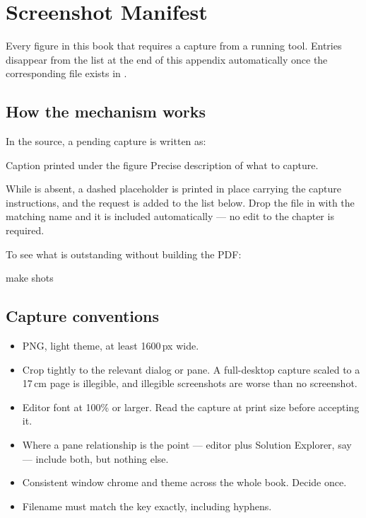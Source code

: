 \chapter{Screenshot Manifest}
\label{app:screenshots}

Every figure in this book that requires a capture from a running tool. Entries
disappear from the list at the end of this appendix automatically once the
corresponding file exists in .

\section{How the mechanism works}

In the source, a pending capture is written as:

\begin{yamlcode}[caption={Requesting a screenshot}, label={lst:needscreenshot}]
%
{Caption printed under the figure}%
{Precise description of what to capture.}
\end{yamlcode}

While  is absent, a dashed
placeholder is printed in place carrying the capture instructions, and the request
is added to the list below. Drop the file in with the matching name and it is
included automatically --- no edit to the chapter is required.

To see what is outstanding without building the PDF:

\begin{shellcmd}
make shots
\end{shellcmd}

\section{Capture conventions}

\begin{itemize}[leftmargin=1.4em]
\item PNG, light theme, at least 1600\,px wide.
\item Crop tightly to the relevant dialog or pane. A full-desktop capture scaled
      to a 17\,cm page is illegible, and illegible screenshots are worse than no
      screenshot.
\item Editor font at 100\% or larger. Read the capture at print size before
      accepting it.
\item Where a pane relationship is the point --- editor plus Solution Explorer,
      say --- include both, but nothing else.
\item Consistent window chrome and theme across the whole book. Decide once.
\item Filename must match the key exactly, including hyphens.
\end{itemize}

